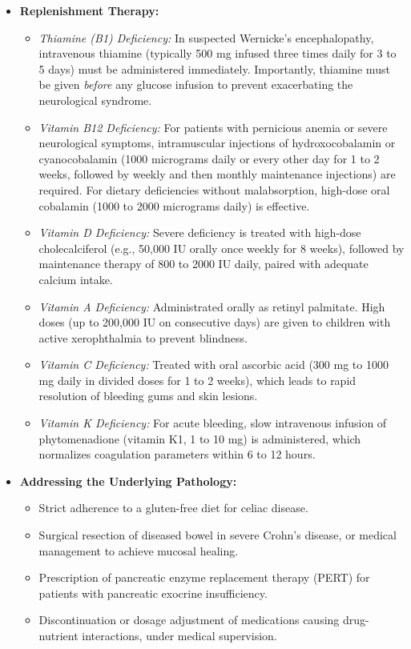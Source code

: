 \begin{itemize}
    \item \textbf{Replenishment Therapy:}
    \begin{itemize}
        \item \textit{Thiamine (B1) Deficiency:} In suspected Wernicke's encephalopathy, intravenous thiamine (typically 500 mg infused three times daily for 3 to 5 days) must be administered immediately. Importantly, thiamine must be given \textit{before} any glucose infusion to prevent exacerbating the neurological syndrome.
        \item \textit{Vitamin B12 Deficiency:} For patients with pernicious anemia or severe neurological symptoms, intramuscular injections of hydroxocobalamin or cyanocobalamin (1000 micrograms daily or every other day for 1 to 2 weeks, followed by weekly and then monthly maintenance injections) are required. For dietary deficiencies without malabsorption, high-dose oral cobalamin (1000 to 2000 micrograms daily) is effective.
        \item \textit{Vitamin D Deficiency:} Severe deficiency is treated with high-dose cholecalciferol (e.g., 50,000 IU orally once weekly for 8 weeks), followed by maintenance therapy of 800 to 2000 IU daily, paired with adequate calcium intake.
        \item \textit{Vitamin A Deficiency:} Administrated orally as retinyl palmitate. High doses (up to 200,000 IU on consecutive days) are given to children with active xerophthalmia to prevent blindness.
        \item \textit{Vitamin C Deficiency:} Treated with oral ascorbic acid (300 mg to 1000 mg daily in divided doses for 1 to 2 weeks), which leads to rapid resolution of bleeding gums and skin lesions.
        \item \textit{Vitamin K Deficiency:} For acute bleeding, slow intravenous infusion of phytomenadione (vitamin K1, 1 to 10 mg) is administered, which normalizes coagulation parameters within 6 to 12 hours.
    \end{itemize}

    \item \textbf{Addressing the Underlying Pathology:}
    \begin{itemize}
        \item Strict adherence to a gluten-free diet for celiac disease.
        \item Surgical resection of diseased bowel in severe Crohn's disease, or medical management to achieve mucosal healing.
        \item Prescription of pancreatic enzyme replacement therapy (PERT) for patients with pancreatic exocrine insufficiency.
        \item Discontinuation or dosage adjustment of medications causing drug-nutrient interactions, under medical supervision.
    \end{itemize}


\end{itemize}
